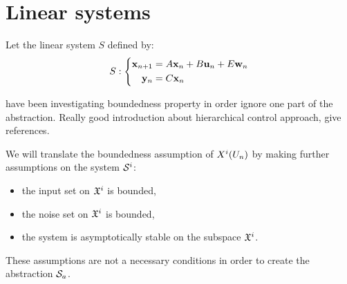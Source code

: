 \newcommand{\xinf}{\underline{\vect{x}}}%
\newcommand{\xsup}{\overline{\vect{x}}}%
\newcommand{\xinit}{\vect{x}_0}%
\newcommand{\xn}{\vect{x}_n}%
\newcommand{\un}{\vect{u}_n}%
\newcommand{\wn}{\vect{w}_n}%
\newcommand{\yn}{\vect{y}_n}%
\newcommand{\xnn}{\vect{x}_{n+1}}%
\newcommand{\Sproc}{$\mathcal{S}$-procedure}%
%
\section{Linear systems}
Let the linear system $S$ defined by:
\begin{equation} \label{lin_sys}
S:
\left\{
\begin{aligned}
\xnn &= A \xn + B \un + E \wn \\
\yn &= C \xn
\end{aligned}
\right.
\end{equation}

\cite{liu2014abstraction} have been investigating boundedness property in order ignore one part of the abstraction.
Really good introduction about hierarchical control approach, give references.


We will translate the boundedness assumption of $X^i(U_n)$ by making further assumptions on the system $\mathcal{S}^i$:
\begin{itemize}[noitemsep,nolistsep]
\item the input set on $\mathfrak{X}^i$ is bounded,
\item the noise set on $\mathfrak{X}^i$ is bounded,
\item the system is asymptotically stable on the subspace $\mathfrak{X}^i$.
\end{itemize}
These assumptions are not a necessary conditions in order to create the abstraction $\mathcal{S}_a$.

